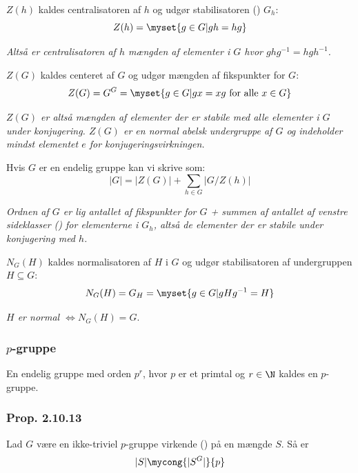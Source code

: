 $Z(h)$ kaldes centralisatoren af $h$ og udgør stabilisatoren ()
$G_h$:
\begin{equation*}
  Z(h) = \myset{g \in G | gh = hg}
\end{equation*}

\textit{Altså er centralisatoren af $h$ mængden af elementer i $G$ hvor
$ghg^{-1} = hgh^{-1}$.}

$Z(G)$ kaldes centeret af $G$ og udgør mængden af fikspunkter for $G$:
\begin{equation*}
  Z(G) = G^G = \myset{g \in G|gx = xg \text{ for alle }x \in G}
\end{equation*}

\textit{$Z(G)$ er altså mængden af elementer der er stabile med alle elementer i
$G$ under konjugering. $Z(G)$ er en normal abelsk undergruppe af $G$ og
indeholder mindst elementet $e$ for konjugeringsvirkningen.}

Hvis $G$ er en endelig gruppe kan vi skrive  som:
\begin{equation*}
  |G| = |Z(G)| + \sum_{h \in G}|G/Z(h)|
\end{equation*}

\textit{Ordnen af $G$ er lig antallet af fikspunkter for $G$ + summen af
antallet af venstre sideklasser () for elementerne i $G_h$,
altså de elementer der er stabile under konjugering med $h$.}

$N_G(H)$ kaldes normalisatoren af $H$ i $G$ og udgør stabilisatoren af
undergruppen $H \subseteq G$:
\begin{equation*}
  N_G(H) = G_H = \myset{g \in G | gHg^{-1} = H}
\end{equation*}

\textit{$H$ er normal $\iff N_G(H) = G$}.

\subsubsection{$p$-gruppe}
\label{p-gruppe}
En endelig gruppe med orden $p^r$, hvor $p$ er et primtal og $r \in \N$ kaldes
en $p$-gruppe.

\subsubsection{Prop. 2.10.13}
Lad $G$ være en ikke-triviel $p$-gruppe virkende () på en mængde $S$.
Så er 
\begin{equation*}
  |S| \mycong{|S^G|}{p}
\end{equation*}

